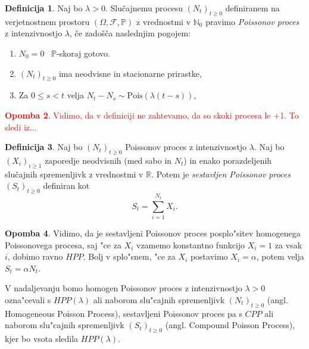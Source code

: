 \documentclass[12pt, a4paper, reqno]{amsart}
\theoremstyle{definition} %
\newtheorem{definicija}{Definicija}[section]
\newtheorem{opomba}[definicija]{Opomba}
\theoremstyle{plain} %
\newcommand{\N}{\mathbb{N}}
\newcommand{\Prob}{\mathbb{P}}
\newcommand{\1}{\mathds{1}}
\newcommand{\Pois}[1]{\text{Pois}(#1)}
\begin{document}
    \begin{definicija}
        Naj bo $\lambda > 0$. Slučajnemu procesu $(N_t)_{t\geq 0}$ definiranem na verjetnostnem 
        prostoru $(\Omega, \mathcal{F}, \mathbb{P})$ z vrednostmi v $\N_0$ pravimo 
        \textit{Poissonov proces} z intenzivnostjo $\lambda$, če zadošča naslednjim pogojem:
        \begin{enumerate}
            \item $N_0 = 0$ \ $\Prob$-skoraj gotovo.
            \item $(N_t)_{t\geq 0}$ ima neodvisne in stacionarne prirastke,
            \item Za $0 \leq s < t$ velja $ N_t - N_s \sim\Pois{\lambda(t - s)}$,
        \end{enumerate}
        \label{def:HPP}
    \end{definicija}
\textcolor{red}{
    \begin{opomba}
        Vidimo, da v definiciji ne zahtevamo, da so skoki procesa le +1. To sledi iz...
        \label{op:skoki}
    \end{opomba}
}
    \begin{definicija}
        Naj bo $(N_t)_{t\geq0}$ Poissonov proces z intenzivnostjo $\lambda$. 
        Naj bo $(X_i)_{i\geq1}$ zaporedje neodvisnih (med sabo in $N_t$) in enako 
        porazdeljenih slučajnih spremenljivk z vrednostmi v $\mathbb{R}$. Potem je 
        \textit{sestavljen Poissonov proces} $(S_t)_{t\geq0}$ definiran kot
        $$
            S_t = \sum_{i=1}^{N_t} X_i.
        $$
        \label{def:CPP}
    \end{definicija}

    \begin{opomba}
        Vidimo, da je sestavljeni Poissonov proces posplo"sitev homogenega Poissonovega procesa, saj "ce za
        $X_i$ vzamemo konstantno funkcijo $X_i = 1$ za vsak $i$, dobimo ravno $HPP$. Bolj v splo"snem, "ce za $X_i$ 
        postavimo $X_i = \alpha$, potem velja $S_t = \alpha N_t$.
        \label{op:CPPHPPPovezava}
    \end{opomba}

    V nadaljevanju bomo homogen Poissonov proces z intenzivnostjo $\lambda >0$ ozna"cevali s $HPP(\lambda)$ 
    ali naborom slu"cajnih spremenljivk $(N_t)_{t\geq0}$ (angl. Homogeneous Poisson Process), 
    sestavljeni Poissonov proces pa s $CPP$ ali naborom slu"cajnih spremenljivk $(S_t)_{t\geq0}$ 
    (angl. Compound Poisson Process), kjer bo vsota sledila $HPP(\lambda)$.
\end{document}
